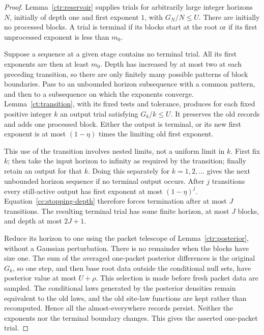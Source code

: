 \begin{proof}
Lemma~\ref{ctr:reservoir} supplies trials for arbitrarily large
integer horizons $N$, initially of depth one and first exponent $1$,
with $G_N/N\le U$.  There are initially no processed blocks.  A trial
is terminal if its blocks start at the root or if its first unprocessed
exponent is less than $m_0$.

Suppose a sequence at a given stage contains no terminal trial.  All its
first exponents are then at least $m_0$.  Depth has increased by at most
two at each preceding transition, so there are only finitely many
possible patterns of block boundaries.  Pass to an unbounded horizon
subsequence with a common pattern, and then to a subsequence on which
the exponents converge.  Lemma~\ref{ct:transition}, with its
fixed tests and tolerance, produces for each fixed positive integer $k$
an output trial satisfying $G_k/k\le U$.  It preserves the old records
and adds one processed block.  Either the output is terminal, or its
new first exponent is at most $(1-\eta)$ times the limiting old first
exponent.

This use of the transition involves nested limits, not a uniform limit
in $k$.  First fix $k$; then take the input horizon to infinity as
required by the transition; finally retain an output for that $k$.
Doing this separately for $k=1,2,\ldots$ gives the next unbounded
horizon sequence if no terminal output occurs.  After $j$ transitions
every still-active output has first exponent at most $(1-\eta)^j$.
Equation~\eqref{cc:stopping-depth} therefore forces termination after
at most $J$ transitions.  The resulting terminal trial has some finite
horizon, at most $J$ blocks, and depth at most $2J+1$.

Reduce its horizon to one using the packet telescope of
Lemma~\ref{ctr:posterior}, without a Gaussian perturbation.  There is
no remainder when the blocks have size one.  The sum of the averaged
one-packet posterior differences is the original $G_k$, so one step,
and then base root data outside the conditional null sets, have
posterior value at most $U+\rho$.  This selection is made before fresh
packet data are sampled.  The conditional laws generated by the
posterior densities remain equivalent to the old laws, and the old
site-law functions are kept rather than recomputed.  Hence all the
almost-everywhere records persist.  Neither the exponents nor the
terminal boundary changes.  This gives the asserted one-packet trial.
\end{proof}

